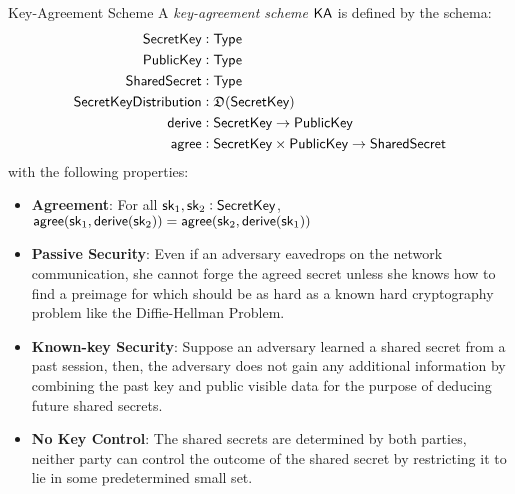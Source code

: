 \begin{definitiontoc}{Key-Agreement Scheme}
    A \emph{key-agreement scheme} ${\textsf{KA}}$ is defined by the schema:
    \begin{align*}
        {\textsf{SecretKey}}    &: {\textsf{Type}} \\
        {\textsf{PublicKey}}    &: {\textsf{Type}} \\
        {\textsf{SharedSecret}} &: {\textsf{Type}} \\
        {\textsf{SecretKeyDistribution}} &: \mathfrak{D}({\textsf{SecretKey}}) \\
        {\textsf{derive}}       &: {\textsf{SecretKey}} \to {\textsf{PublicKey}} \\
        {\textsf{agree}}        &: {\textsf{SecretKey}} \times {\textsf{PublicKey}} \to {\textsf{SharedSecret}}
    \end{align*}
    with the following properties:
    \begin{itemize}
        \item \textbf{Agreement}: For all ${\textsf{sk}}_1, {\textsf{sk}}_2 : {\textsf{SecretKey}}$, ${\textsf{agree}}({\textsf{sk}}_1, {\textsf{derive}}({\textsf{sk}}_2)) = {\textsf{agree}}({\textsf{sk}}_2, {\textsf{derive}}({\textsf{sk}}_1))$
        \item \textbf{Passive Security}: Even if an adversary eavedrops on the network communication, she cannot forge the agreed secret unless she knows how to find a preimage for \derive{} which should be as hard as a known hard cryptography problem like the Diffie-Hellman Problem.
        \item \textbf{Known-key Security}: Suppose an adversary learned a shared secret from a past session, then, the adversary does not gain any additional information by combining the past key and public visible data for the purpose of deducing future shared secrets.
        \item \textbf{No Key Control}: The shared secrets are determined by both parties, neither party can control the outcome of the shared secret by restricting it to lie in some predetermined small set.
    \end{itemize}
\end{definitiontoc}

